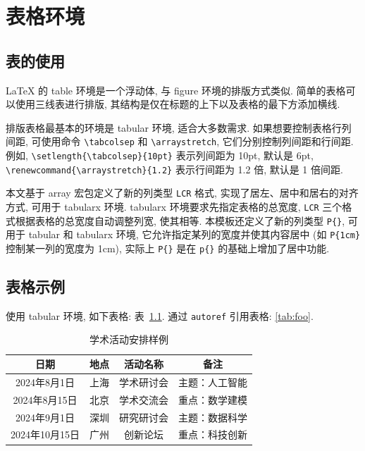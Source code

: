 

\chapter{表格环境}

\section{表的使用}

LaTeX 的 table 环境是一个浮动体, 与 figure 环境的排版方式类似. 简单的表格可以使用三线表进行排版, 其结构是仅在标题的上下以及表格的最下方添加横线.

排版表格最基本的环境是 tabular 环境, 适合大多数需求. 如果想要控制表格行列间距, 可使用命令 \verb|\tabcolsep| 和 \verb|\arraystretch|, 它们分别控制列间距和行间距. 例如, \verb|\setlength{\tabcolsep}{10pt}| 表示列间距为 10pt, 默认是 6pt, \verb|\renewcommand{\arraystretch}{1.2}| 表示行间距为 1.2 倍, 默认是 1 倍间距.

本文基于 array 宏包定义了新的列类型 \verb|LCR| 格式, 实现了居左、居中和居右的对齐方式, 可用于 tabularx 环境. tabularx 环境要求先指定表格的总宽度, \verb|LCR| 三个格式根据表格的总宽度自动调整列宽, 使其相等. 本模板还定义了新的列类型 \verb|P{}|, 可用于 tabular 和 tabularx 环境, 它允许指定某列的宽度并使其内容居中 (如 \verb|P{1cm}| 控制某一列的宽度为 1cm), 实际上 \verb|P{}| 是在 \verb|p{}| 的基础上增加了居中功能.


\section{表格示例}

使用 tabular 环境, 如下表格: 表~\ref{tab:foo}. 通过 \verb|autoref| 引用表格: \autoref{tab:foo}.

\begin{table}[htp!]
\centering
\setlength{\tabcolsep}{12pt}  %
\renewcommand{\arraystretch}{1.2}
\caption{学术活动安排样例}
\label{tab:foo}
\begin{tabular}{|c|c|c|c|}
\hline
\textbf{日期}  & \textbf{地点} & \textbf{活动名称} & \textbf{备注} \\ \hline
2024年8月1日      & 上海       & 学术研讨会      & 主题：人工智能 \\ \hline
2024年8月15日    & 北京       & 学术交流会      & 重点：数学建模 \\ \hline
2024年9月1日      & 深圳       & 研究研讨会      & 主题：数据科学 \\ \hline
2024年10月15日  & 广州       & 创新论坛         & 重点：科技创新 \\ \hline
\end{tabular}
\end{table}

